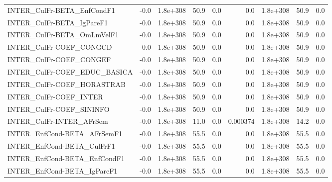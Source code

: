 \begin{tabular}{lrrrrrrrr}
INTER\_CulFr-BETA\_EnfCondF1            &        -0.0 &     1.8e+308 &    50.9 &      0.0 &        0.0 &    1.8e+308 &         50.9 &           0.0 \\
INTER\_CulFr-BETA\_IgPareF1             &        -0.0 &     1.8e+308 &    50.9 &      0.0 &        0.0 &    1.8e+308 &         50.9 &           0.0 \\
INTER\_CulFr-BETA\_OmLmVelF1            &        -0.0 &     1.8e+308 &    50.9 &      0.0 &        0.0 &    1.8e+308 &         50.9 &           0.0 \\
INTER\_CulFr-COEF\_CONGCD               &        -0.0 &     1.8e+308 &    50.9 &      0.0 &        0.0 &    1.8e+308 &         50.9 &           0.0 \\
INTER\_CulFr-COEF\_CONGEF               &        -0.0 &     1.8e+308 &    50.9 &      0.0 &        0.0 &    1.8e+308 &         50.9 &           0.0 \\
INTER\_CulFr-COEF\_EDUC\_BASICA          &        -0.0 &     1.8e+308 &    50.9 &      0.0 &        0.0 &    1.8e+308 &         50.9 &           0.0 \\
INTER\_CulFr-COEF\_HORASTRAB            &        -0.0 &     1.8e+308 &    50.9 &      0.0 &        0.0 &    1.8e+308 &         50.9 &           0.0 \\
INTER\_CulFr-COEF\_INTER                &        -0.0 &     1.8e+308 &    50.9 &      0.0 &        0.0 &    1.8e+308 &         50.9 &           0.0 \\
INTER\_CulFr-COEF\_SININFO              &        -0.0 &     1.8e+308 &    50.9 &      0.0 &        0.0 &    1.8e+308 &         50.9 &           0.0 \\
INTER\_CulFr-INTER\_AFrSem              &        -0.0 &     1.8e+308 &    11.0 &      0.0 &   0.000374 &    1.8e+308 &         14.2 &           0.0 \\
INTER\_EnfCond-BETA\_AFrSemF1           &        -0.0 &     1.8e+308 &    55.5 &      0.0 &        0.0 &    1.8e+308 &         55.5 &           0.0 \\
INTER\_EnfCond-BETA\_CulFrF1            &        -0.0 &     1.8e+308 &    55.5 &      0.0 &        0.0 &    1.8e+308 &         55.5 &           0.0 \\
INTER\_EnfCond-BETA\_EnfCondF1          &        -0.0 &     1.8e+308 &    55.5 &      0.0 &        0.0 &    1.8e+308 &         55.5 &           0.0 \\
INTER\_EnfCond-BETA\_IgPareF1           &        -0.0 &     1.8e+308 &    55.5 &      0.0 &        0.0 &    1.8e+308 &         55.5 &           0.0 \\

\end{tabular}

